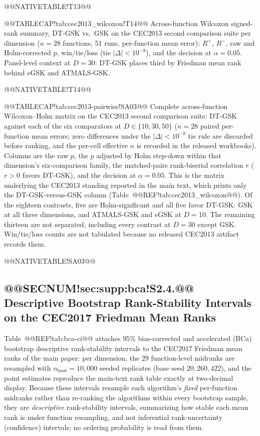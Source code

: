 \documentclass[10pt,a4paper]{article}
\newcommand{\dtgsk}{DT-GSK}
\newcommand{\atmals}{ATMALS-GSK}
\newcommand{\egsk}{eGSK}
\begin{document}
@@NATIVETABLE!T13@@






\clearpage


@@TABLECAP!tab:cec2013\_wilcoxon!T14@@ Across-function Wilcoxon signed-rank summary, \dtgsk{} vs.\ GSK
on the CEC2013 second comparison suite per dimension ($n = 28$ functions,
51 runs, per-function mean error): $R^{+}$, $R^{-}$, raw and
Holm-corrected $p$, win/tie/loss (tie $|\Delta| < 10^{-8}$), and the
decision at $\alpha = 0.05$.  Panel-level context at $D = 30$:
\dtgsk{} places third by Friedman mean rank behind \egsk{} and
\atmals{}.

@@NATIVETABLE!T14@@





@@TABLECAP!tab:cec2013-pairwise!SA03@@ Complete across-function Wilcoxon--Holm matrix on the CEC2013 second
comparison suite: \dtgsk{} against each of the six comparators at
$D \in \{10, 30, 50\}$ ($n = 28$ paired per-function mean errors; zero differences
under the $|\Delta| < 10^{-8}$ tie rule are discarded before ranking, and the
per-cell effective $n$ is recorded in the released workbooks).  Columns are the raw $p$, the $p$ adjusted by
Holm step-down within that dimension's six-comparison family, the matched-pairs
rank-biserial correlation $r$ ($r > 0$ favors \dtgsk{}), and the decision at
$\alpha = 0.05$.  This is the matrix underlying the CEC2013 standing reported in
the main text, which prints only the \dtgsk{}-versus-GSK column
(Table~@@REF!tab:cec2013\_wilcoxon@@).  Of the eighteen contrasts, five are
Holm-significant and all five favor \dtgsk{}: GSK at all three dimensions,
and \atmals{} and \egsk{} at $D = 10$.  The remaining thirteen are not
separated, including every contrast at $D = 30$ except GSK.
Win/tie/loss counts are not tabulated because no released CEC2013 artifact
records them.

@@NATIVETABLE!SA03@@



\subsection{@@SECNUM!sec:supp:bca!S2.4.@@ Descriptive Bootstrap Rank-Stability Intervals on the CEC2017 Friedman Mean Ranks}\label{sec:supp:bca}

Table~@@REF!tab:bca-ci@@ attaches $95\%$ bias-corrected and accelerated
(BCa) bootstrap descriptive rank-stability intervals to the
CEC2017 Friedman mean ranks of the main paper: per dimension, the 29
function-level midranks are resampled with $n_{\text{boot}} = 10{,}000$
seeded replicates (base seed $20{,}260{,}422$), and the point
estimates reproduce the main-text rank table exactly at two-decimal
display.
Because these intervals resample each algorithm's \emph{fixed} per-function
midranks rather than re-ranking the algorithms within every bootstrap
sample, they are \emph{descriptive} rank-stability intervals, summarizing
how stable each mean rank is under function resampling, and not
inferential rank-uncertainty (confidence) intervals; no ordering probability
is read from them.
\end{document}
